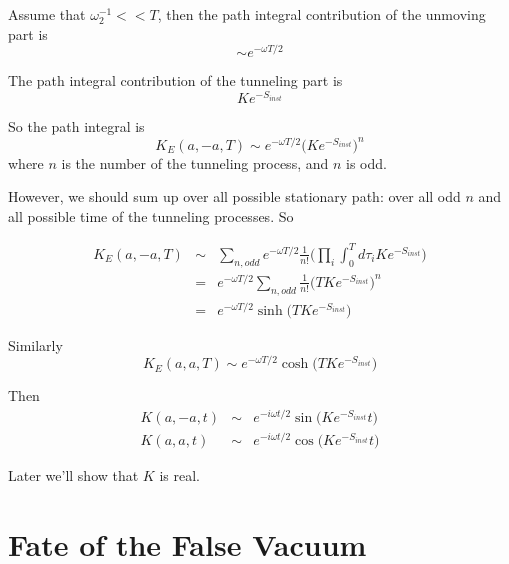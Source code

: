 \documentclass[12pt]{book}
\begin{document}
	Assume that $\omega_2^{-1}<< T$, then the path integral contribution of the unmoving part is
	\begin{equation}
		\sim e^{-\omega T/2}
	\end{equation}
	
	The path integral contribution of the tunneling part is
	\begin{equation}
		Ke^{-S_{inst}}
	\end{equation}
	
	So the path integral is 
	\begin{equation}
		K_E(a,-a,T)\sim e^{-\omega T/2}\Big(Ke^{-S_{inst}}\Big)^n
	\end{equation}
	where $n$ is the number of the tunneling process, and $n$ is odd.
	
	However, we should sum up over all possible stationary path: over all odd $n$ and all possible time of the tunneling processes. So
	
	
	\begin{eqnarray}
		K_E(a,-a,T)&\sim& \sum_{n,odd}e^{-\omega T/2}\frac 1{n!}\Big(\prod_i\int_0^T d\tau_i Ke^{-S_{inst}}\Big)\\
		&=&e^{-\omega T/2}\sum_{n,odd}\frac 1{n!}\Big(TKe^{-S_{inst}}\Big)^n\\
		&=&e^{-\omega T/2}\sinh\big(TKe^{-S_{inst}}\big)
	\end{eqnarray}
	
	Similarly
	\begin{equation}
		K_E(a,a,T)\sim e^{-\omega T/2}\cosh\big(TKe^{-S_{inst}}\big)
	\end{equation}
	
	Then
	\begin{eqnarray}
		K(a,-a,t)&\sim&e^{-i\omega t/2}\sin\big(Ke^{-S_{inst}}t\big)\\
		K(a,a,t)&\sim& e^{-i\omega t/2}\cos\big(Ke^{-S_{inst}}t\big)
	\end{eqnarray}
	
	Later we'll show that $K$ is real.
	\section{Fate of the False Vacuum}
	
\end{document}
